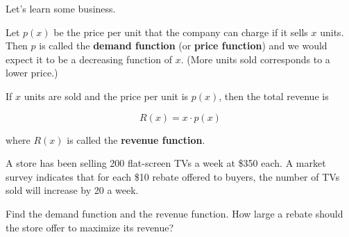 \documentclass[12pt]{amsart}
\begin{document}
\newpage

\begin{question}
	Let's learn some business.

	Let \( p(x) \) be the price per unit that the company can charge if it sells \( x \) units. Then \( p \) is called the \textbf{demand function} (or \textbf{price function}) and we would expect it to be a decreasing function of \( x \). (More units sold corresponds to a lower price.)

	If \( x \) units are sold and the price per unit is \( p(x) \), then the total revenue is

	\[
		R(x) = x \cdot p(x)
	\]

	where \( R(x) \) is called the \textbf{revenue function}.

	A store has been selling 200 flat-screen TVs a week at \$350 each. A market survey indicates that for each \$10 rebate offered to buyers, the number of TVs sold will increase by 20 a week.

	Find the demand function and the revenue function. How large a rebate should the store offer to maximize its revenue?
\end{question}
\end{document}
